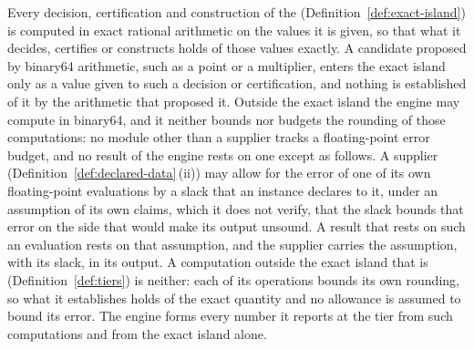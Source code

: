 
\begin{requirement}\label{req:exact-island}
Every decision, certification and construction of the 
(Definition~\ref{def:exact-island}) is computed in exact rational arithmetic on
the values it is given, so that what it decides, certifies or constructs holds
of those values exactly. A candidate proposed by binary64 arithmetic, such as
a point or a multiplier, enters the exact island only as a value given to such
a decision or certification, and nothing is established of it by the
arithmetic that proposed it. Outside the exact island the engine may compute
in binary64, and it neither bounds nor budgets the rounding of those
computations: no module other than a supplier tracks a floating-point error
budget, and no result of the engine rests on one except as follows. A
supplier (Definition~\ref{def:declared-data}\,(ii)) may allow for the error of
one of its own floating-point evaluations by a slack that an instance declares
to it, under an assumption of its own claims, which it does not verify, that
the slack bounds that error on the side that would make its output unsound.
A result that rests on such an evaluation rests on that assumption, and the
supplier carries the assumption, with its slack, in its output. A computation
outside the exact island that is 
(Definition~\ref{def:tiers}) is neither: each of its operations bounds its
own rounding, so what it establishes holds of the exact quantity and no
allowance is assumed to bound its error. The engine forms every number it
reports at the  tier from such computations and from the
exact island alone.
\end{requirement}
